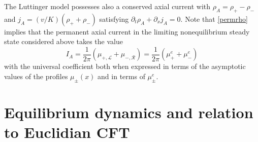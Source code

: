 \documentclass[12pt,a4paper]{article}
\def\nsection#1{\section{#1}\setcounter{equation}{0}}
\newcommand{\cL}{\mathcal{L}}
\newcommand{\cR}{\mathcal{R}}
\theoremstyle{definition}
\theoremstyle{remark}
\begin{document}
The Luttinger model possesses also a conserved axial current 
with $\rho_A=\rho_+-\rho_-$ and 
$j_A=(v/K)(\rho_++\rho_-)$ satisfying $\partial_t\rho_A+\partial_xj_A=0$.
Note that \eqref{permrho}
implies that the permanent axial current in the limiting 
nonequilibrium steady state considered above takes the value
%
\begin{equation}
I_A
= \frac{1}{2\pi} \left( \mu_{+,\cL}+\mu_{-,\cR} \right)
= \frac{1}{2\pi} \left( \mu^{e}_++\mu^{e}_- \right)
\end{equation}
%
with the universal coefficient both when expressed in terms of the
asymptotic values of the profiles $\mu_\pm(x)$ and in terms of $\mu^{e}_\pm$.


\nsection{Equilibrium dynamics and relation to Euclidian CFT}
\label{sec:5}
\end{document}
